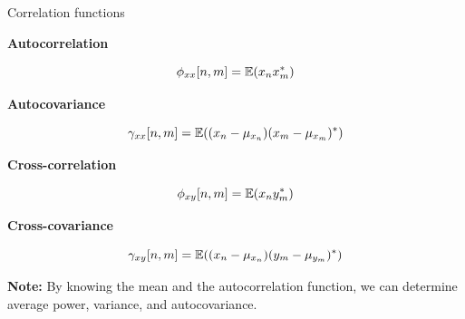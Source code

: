 \documentclass[10pt]{beamer}
\begin{document}
\begin{frame}{Correlation functions}

\textbf{Autocorrelation}

\begin{equation*}
\phi_{xx}[n, m] = \operatorname{\mathbb{E}}(x_nx_m^*) 
\end{equation*}

\textbf{Autocovariance}

\begin{equation*}
\gamma_{xx}[n, m] = \operatorname{\mathbb{E}}((x_n-\mu_{x_n})(x_m - \mu_{x_m})^*) 
\end{equation*}

\textbf{Cross-correlation}

\begin{equation*}
\phi_{xy}[n, m] = \operatorname{\mathbb{E}}(x_ny_m^*) 
\end{equation*}

\textbf{Cross-covariance}

\begin{equation*}
\gamma_{xy}[n, m] = \operatorname{\mathbb{E}}((x_n-\mu_{x_n})(y_m - \mu_{y_m})^*) 
\end{equation*}

\textbf{Note:} By knowing the mean and the autocorrelation function, we can determine average power, variance, and autocovariance.

\end{frame}
\end{document}

